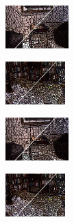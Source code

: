 \begin{figure}
\begin{subfigure}[b]{0.129\textwidth}
    \end{subfigure}
    \begin{subfigure}[b]{0.02\textwidth}
    \end{subfigure}
    \begin{subfigure}[b]{0.1375\textwidth}
        \includegraphics[height=1.65cm]{pictures/nyuv2/slic/cropped/slic_00001297_contours}
    \end{subfigure}
    \begin{subfigure}[b]{0.129\textwidth}
        \includegraphics[height=1.65cm]{pictures/sunrgbd/slic/cropped/slic_00007477_contours}
    \end{subfigure}
    \begin{subfigure}[b]{0.02\textwidth}
    \end{subfigure}
    \begin{subfigure}[b]{0.1375\textwidth}
        \includegraphics[height=1.65cm]{pictures/nyuv2/crs/cropped/crs_00001297_contours}
    \end{subfigure}
    \begin{subfigure}[b]{0.129\textwidth}
        \includegraphics[height=1.65cm]{pictures/sunrgbd/crs/cropped/crs_00007477_contours}
    \end{subfigure}\\
    \begin{subfigure}[b]{0.02\textwidth}

\end{subfigure}
\end{figure}
